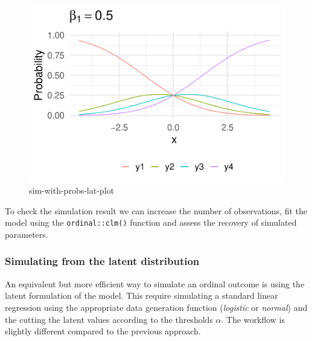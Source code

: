 \documentclass[
  man,floatsintext]{apa6}
\begin{document}
\begin{figure}

{\centering \includegraphics{paper-new_files/figure-latex/sim-with-probs-lat-plot-1} 

}

\caption{sim-with-probs-lat-plot}\label{fig:sim-with-probs-lat-plot}
\end{figure}

\normalsize

\scriptsize

\normalsize

To check the simulation result we can increase the number of observations, fit the model using the \texttt{ordinal::clm()} function and assess the recovery of simulated parameters.

\scriptsize

\normalsize

\scriptsize

\normalsize

\subsubsection{Simulating from the latent distribution}\label{simulating-from-the-latent-distribution}

An equivalent but more efficient way to simulate an ordinal outcome is using the latent formulation of the model. This require simulating a standard linear regression using the appropriate data generation function (\emph{logistic} or \emph{normal}) and the cutting the latent values according to the thresholds \(\alpha\). The workflow is slightly different compared to the previous approach.
\end{document}
